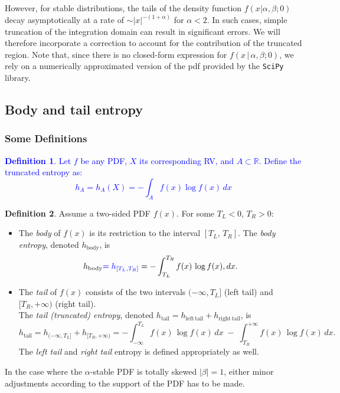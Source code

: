 \documentclass{article}
\theoremstyle{definition}
\newtheorem{definition}{Definition}[section]
\begin{document}
However, for stable distributions, the tails of the density function \(f(x |\alpha, \beta; 0)\) decay asymptotically at a rate of \(\sim |x|^{-(1+\alpha)}\) for \(\alpha < 2\). In such cases, simple truncation of the integration domain can result in significant errors. We will therefore incorporate a correction to account for the contribution of the truncated region. Note that, since there is no closed-form expression for \(f(x\,|\,\alpha,\beta;0)\), we rely on a numerically approximated version of the pdf provided by the \texttt{SciPy} library.


\subsection{Body and tail entropy}
\subsubsection{Some Definitions}
\vspace{-15pt}
\textcolor{blue}{
\begin{definition}\label{def:partial-entropy}
Let \(f\) be any PDF, \(X\) its corresponding RV, and \(A \subset \mathbb{R}\).
Define the truncated entropy as:
\[
h_A = h_A(X) = - \int_A f(x) \log{f(x)} \, dx 
\]
\end{definition}
}

\begin{definition}\label{def:body-tail-entropy}
Assume a two-sided PDF \(f(x)\). For some \(T_{L}<0\), \(T_R>0\):
\begin{itemize}
  \item The \emph{body} of \(f(x)\) is its restriction to the interval \([T_{L},\,T_R]\). The \emph{body entropy}, denoted \(h_{\mathrm{body}}\), is
    \[
      h_{\mathrm{body}}
      \textcolor{blue}{=h_{[T_L,T_R]}}=-\int_{T_{L}}^{T_R} 
        f(x)\,\log f(x),dx.
    \]
  \item The \emph{tail} of \(f(x)\) consists of the two intervals \((-\infty,T_{L}]\) (left tail) and \([T_R,+\infty)\) (right tail).\\
  The \emph{tail (truncated) entropy}, denoted \(h_{\mathrm{tail}}=h_{\mathrm{left\,tail}}+h_{\mathrm{right\,tail}}\), is
    \[
      h_{\mathrm{tail}}=h_{(-\infty,T_L]}+h_{[T_R,+\infty)}
      = -\int_{-\infty}^{T_{L}}
         f(x)\,\log f(x)\,dx
      \;-\;\int_{T_R}^{+\infty}
         f(x)\,\log f(x)\,dx.
    \]
    The \emph{left tail} and \emph{right tail} entropy is defined appropriately as well.
\end{itemize}
In the case where the \(\alpha\)-stable PDF is totally skewed \(|\beta|=1\), either minor adjustments according to the support of the PDF has to be made.
\end{definition}
\end{document}

